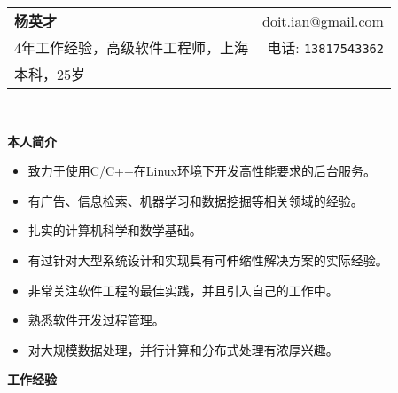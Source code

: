 \documentclass[letterpaper,11pt]{article}
\newcommand{\resheading}[1]{{\large \colorbox{mygrey}{\begin{minipage}{\textwidth}{\textbf{#1 \vphantom{p\^{E}}}}\end{minipage}}}}
\begin{document}

\newcommand{\mywebheader}{
\begin{tabular*}{7in}{l@{\extracolsep{\fill}}r}
  \textbf{\LARGE 杨英才} & \href{mailto:doit.ian@gmail.com}{doit.ian@gmail.com} \\
    {\small 4年工作经验，高级软件工程师，上海} & {\small 电话: \texttt{13817543362}} \\
    {\footnotesize 本科，25岁} & \\
  \end{tabular*}
\\
\vspace{0.1in}}

\mywebheader

\resheading{本人简介}

{ \footnotesize

  \begin{itemize}
  \item 致力于使用C/C++在Linux环境下开发高性能要求的后台服务。
  \item 有广告、信息检索、机器学习和数据挖掘等相关领域的经验。
  \item 扎实的计算机科学和数学基础。
  \item 有过针对大型系统设计和实现具有可伸缩性解决方案的实际经验。
  \item 非常关注软件工程的最佳实践，并且引入自己的工作中。
  \item 熟悉软件开发过程管理。
  \item 对大规模数据处理，并行计算和分布式处理有浓厚兴趣。
  \end{itemize}
}

\resheading{工作经验}
\end{document}
